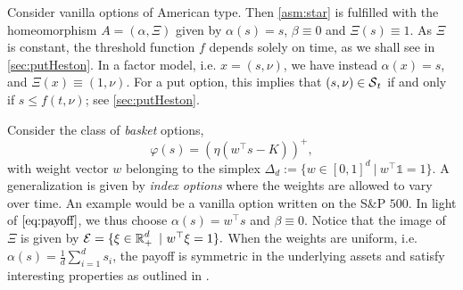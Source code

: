 \begin{example}\label{ex:vanilla}

Consider vanilla  options of American type.  %
Then \cref{asm:star} is fulfilled with the homeomorphism $A = (\alpha,\Xi)$ given by $\alpha(s) = s$, $\beta \equiv 0$ and $\Xi(s) \equiv 1$. %
As $\Xi$ is constant, the threshold function $f$ depends solely on time, as we shall see in  \cref{sec:putHeston}.   In a factor model, i.e. $x = (s,\nu)$, we have instead $\alpha(x)=s$, and $\Xi(x) \equiv (1,\nu)$. For a put option, this implies that $(s,\nu) \in \operatorname{\mathcal{S}}_t$ if and only if $s\le f(t,\nu)$; see \cref{sec:putHeston}.   

\end{example}


\begin{example}\label{ex:bskt}
Consider the class of \textit{basket} options,
$$
\varphi(s)= \left( \eta \left( w^{\top} s - K \right) \right)^{+},
$$
with  weight vector $w$  belonging to the simplex $\Delta_{d} := \{w \in [0,1]^d \ | \ w^\top \mathds{1}=1\} $.
A generalization is given by \textit{index options} where the weights are allowed to vary over time. An example would be a vanilla option written on the S\&P $500$. %
In light of $\eqref{eq:payoff}$, we thus choose $\alpha(s) =  w^{\top} s$ and $\beta \equiv 0$. %
Notice that the image of  $\Xi$ is given by 
$\calE = \{ \xi \in \R_+^d \ | \ w^{\top} \xi =1 \}.$ 
When the weights are uniform, i.e. $\alpha(s) = \frac{1}{d}\sum_{i=1}^d s_i$, the payoff is symmetric in the underlying assets and satisfy interesting properties as outlined in . 

\end{example}

